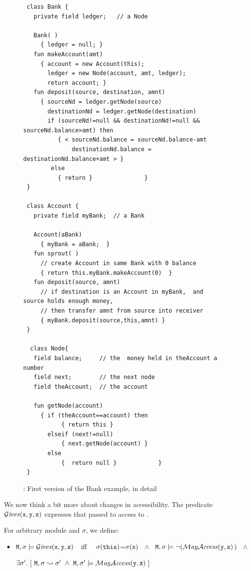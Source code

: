 \documentclass[acmsmall,screen]{acmart}
\begin{document}
\begin{figure}[tbp]
\begin{lstlisting}
 class Bank {
   private field ledger;   // a Node

   Bank( )
     { ledger = null; }
   fun makeAccount(amt)
     { account = new Account(this);
       ledger = new Node(account, amt, ledger);
       return account; }
   fun deposit(source, destination, amnt)
     { sourceNd = ledger.getNode(source)
       destinationNd = ledger.getNode(destination)
       if (sourceNd!=null && destinationNd!=null && sourceNd.balance>amt) then
          { < sourceNd.balance = sourceNd.balance-amt
              destinationNd.balance = destinationNd.balance+amt > }
        else
          { return }               }
 }

 class Account {
   private field myBank;  // a Bank

   Account(aBank)
     { myBank = aBank;  }
   fun sprout( )
     // create Account in same Bank with 0 balance
     { return this.myBank.makeAccount(0)  }
   fun deposit(source, amnt)
     // if destination is an Account in myBank,  and  source holds enough money,
     // then transfer amnt from source into receiver
     { myBank.deposit(source,this,amnt) }
 }

  class Node{
   field balance;     // the  money held in theAccount a number
   field next;        // the next node
   field theAccount;  // the account

   fun getNode(account)
     { if (theAccount==account) then
           { return this }
       elseif (next!=null)
           { next.getNode(account) }
       else
           {  return null }            }	
 }
\end{lstlisting}
\caption{\MOne: First version of the Bank example, in detail}
\label{fig:BankDetailedOne}
 \end{figure}


We now think a bit more about changes in accessibility. The predicate  $\mathcal{G}\textrm{\textit{ives}}({\mbox{\tt{x}}},{\mbox{\tt{y}}},{\mbox{\tt{z}}})$ expresses
that  passed to  access to .

\begin{definition}[Giving]
For arbitrary module \M and $\sigma$, we define:

\begin{itemize}
\item
${\mbox{\tt{M}}},\sigma  \models \mathcal{G}\textrm{\textit{ives}}({\mbox{\tt{x}}},{\mbox{\tt{y}}},{\mbox{\tt{z}}})$\ \ iff \ \
$\sigma({\mbox{\tt{this}}})$=$\sigma({\mbox{\tt{x}}})$ \  $\wedge$ \
${\mbox{\tt{M}}}, \sigma \models \neg (\mathcal{M}\textrm{\textit{ay}}{\mathcal{A}}\textrm{\textit{ccess}}( {\mbox{\tt{y}}},{\mbox{\tt{z}}})\,)$ \ $\wedge$ \\
\strut \hspace{.9cm} $\exists \sigma'. \ [\  {\mbox{\tt{M}}},\sigma \leadsto \sigma'  \  \wedge  \
 {\mbox{\tt{M}}},\sigma' \models \mathcal{M}\textrm{\textit{ay}}{\mathcal{A}}\textrm{\textit{ccess}}( {\mbox{\tt{y}}},{\mbox{\tt{z}}})\ ]$
\end{itemize}

\end{definition}
\end{document}
